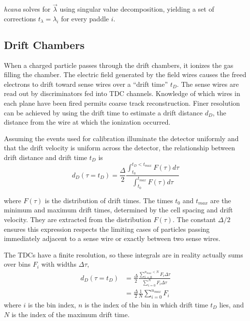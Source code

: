 \begin{itemize}
\textit{hcana} solves for $\vec{\lambda}$ using singular value
decomposition, yielding a set of corrections $t_\lambda = \lambda_i$ for every
paddle $i$.


\end{itemize}

\subsection{Drift Chambers} \label{sec:dc_calib}
When a charged particle passes through the drift chambers, it ionizes the gas
filling the chamber.
The electric field generated by the field wires causes the freed electrons to
drift toward sense wires over a ``drift time'' $t_D$.
The sense wires are read out by discriminators fed into TDC channels.
Knowledge of which wires in each plane have been fired permits coarse track
reconstruction.
Finer resolution can be achieved by using the drift time to estimate a drift
distance $d_D$, the distance from the wire at which the ionization occurred.


Assuming the events used for calibration illuminate the detector uniformly
and that the drift velocity is uniform across the detector, the relationship
between drift distance and drift time $t_D$ is
\begin{equation}
    d_D (\tau=t_D) = \frac{\Delta}{2}
                     \frac{\int_{t_0}^{t_D<t_{max}} F(\tau) d\tau}
                          {\int_{t_0}^{t_{max}} F(\tau) d\tau}
\end{equation}

where $F(\tau)$ is the distribution of drift times.
The times $t_0$ and $t_{max}$ are the minimum and maximum drift times,
determined by the cell spacing and drift velocity.
They are extracted from the distribution $F(\tau)$.
The constant $\Delta/2$ ensures this expression respects the limiting cases of
particles passing immediately adjacent to a sense wire or exactly between
two sense wires.


The TDCs have a finite resolution, so these integrals are in reality actually
sums over bins $F_i$ with widths $\Delta\tau$,
\begin{align} \label{eqn:drift_distance}
    d_D (\tau=t_D) &= \frac{\Delta}{2}
                      \frac{\sum_{i=0}^{n_{max}<N} F_i \Delta\tau}
                           {\sum_{i=0}^{N} F_i \Delta\tau} \\
                 &= \frac{\Delta}{2}
                    \frac{1}{N}\sum_{i=0}^{n_{max}} F_i
\end{align}
where $i$ is the bin index,
$n$ is the index of the bin in which drift time $t_D$ lies,
and $N$ is the index of the maximum drift time.


